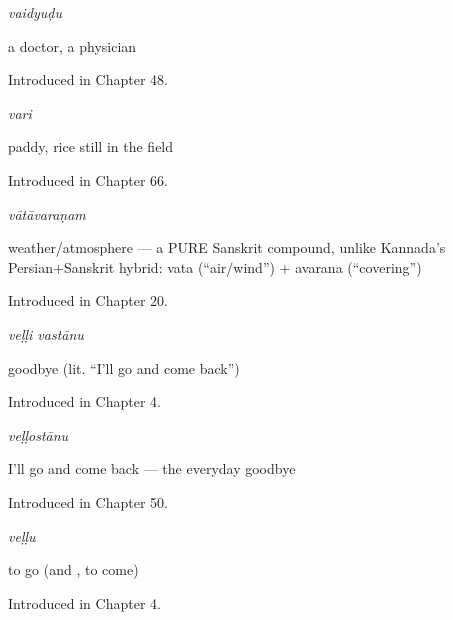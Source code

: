 \noindent\begin{minipage}[t]{\linewidth}
\raggedright
\textbf{}\enspace\emph{vaidyuḍu}\par
\small a doctor, a physician\par
\footnotesize Introduced in Chapter 48.
\end{minipage}\par\medskip

\noindent\begin{minipage}[t]{\linewidth}
\raggedright
\textbf{}\enspace\emph{vari}\par
\small paddy, rice still in the field\par
\footnotesize Introduced in Chapter 66.
\end{minipage}\par\medskip

\noindent\begin{minipage}[t]{\linewidth}
\raggedright
\textbf{}\enspace\emph{vātāvaraṇam}\par
\small weather/atmosphere — a PURE Sanskrit compound, unlike Kannada's Persian+Sanskrit hybrid: vata (\textquotedblleft{}air/wind\textquotedblright{}) + avarana (\textquotedblleft{}covering\textquotedblright{})\par
\footnotesize Introduced in Chapter 20.
\end{minipage}\par\medskip

\noindent\begin{minipage}[t]{\linewidth}
\raggedright
\textbf{ }\enspace\emph{veḷḷi vastānu}\par
\small goodbye (lit. \textquotedblleft{}I'll go and come back\textquotedblright{})\par
\footnotesize Introduced in Chapter 4.
\end{minipage}\par\medskip

\noindent\begin{minipage}[t]{\linewidth}
\raggedright
\textbf{}\enspace\emph{veḷḷostānu}\par
\small I'll go and come back --- the everyday goodbye\par
\footnotesize Introduced in Chapter 50.
\end{minipage}\par\medskip

\noindent\begin{minipage}[t]{\linewidth}
\raggedright
\textbf{}\enspace\emph{veḷḷu}\par
\small to go (and , to come)\par
\footnotesize Introduced in Chapter 4.
\end{minipage}\par\medskip

